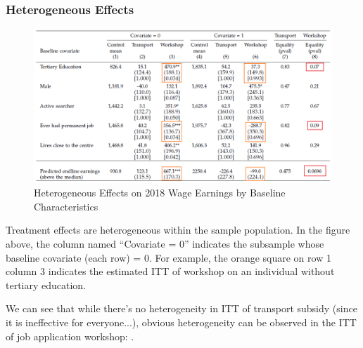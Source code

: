         \subsubsection{Heterogeneous Effects}
            \begin{figure}[H]
                \centering
                \includegraphics[width=5.5in]{images/ch6/Abebe result 6 heterogeneous.png}
                \caption{Heterogeneous Effects on 2018 Wage Earnings by Baseline Characteristics}
            \end{figure}
            Treatment effects are heterogeneous within the sample population. In the figure above, the column named ``Covariate = 0'' indicates the subsample whose baseline covariate (each row) = 0. For example, the orange square on row 1 column 3 indicates the estimated ITT of workshop on an individual without tertiary education.\par
            We can see that while there's no heterogeneity in ITT of transport subsidy (since it is ineffective for everyone...), obvious heterogeneity can be observed in the ITT of job application workshop: .
            